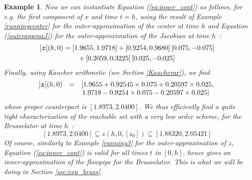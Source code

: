 \documentclass{sig-alternate-05-2015}
\newcommand\ForAuthors[1]%
 {\par\smallskip                     %
  \begin{center}%
   \fbox%
   {\parbox{0.9\linewidth}%
    {\raggedright\sc--- #1}%
   }%
  \end{center}%
  \par\smallskip                     %
 }
\newtheorem{example}{Example}
\def\intvl#1{\mbox{$[ #1 ]$}}
\begin{document}
\begin{example}
Now we can instantiate Equation (\ref{eq:inner_cont}) as follows, for e.g. the first component of $x$ and
time $t=h$, using the result of Example \ref{runningcenter} for the outer-approximation of the center at time $h$ and
Equation (\ref{outerapproxJ}) for the outer-approximation of the Jacobian at time $h$~: 
\begin{multline}
]\z[(h,0) = \left[1.9655, 1.9718\right]+\left[0.9254, 0.9680\right]\left[0.075,-0.075\right]\\
+\left[0.2059, 0.3225\right]\left[0.025,-0.025\right]
\end{multline}
Finally, using Kaucher arithmetic (see Section \ref{Kaucherar}), we find 
$$\begin{array}{rcl}
]\z[(h,0) & = &
\left[1.9655+0.92545\times0.075+0.20597\times0.025, \right. \\
& & \left. 1.9718-0.9254\times 0.075-0.20597\times 0.025\right]
\end{array}$$
\noindent whose proper counterpart is $\left[1.8973,2.0400\right]$.
We thus efficiently find a quite tight characterization of the reachable set with a very low order scheme, for
the Brusselator at time $h$~: 
$$\left[1.8973,2.0400\right]
\subseteq z(h,0,\intvl{z_0})\subseteq \left[1.88320, 2.05421\right]$$
Of course, similarly to Example \ref{running3} for the outer-approxima\-tion of $z$, Equation (\ref{eq:inner_cont})
is valid for all times $t$ in $[0,h]$, hence gives an inner-approximation of the flowpipe for the Brusselator. This is
what we will be doing in Section \ref{sec:exp_bruss}.  
\end{example}

\end{document}
